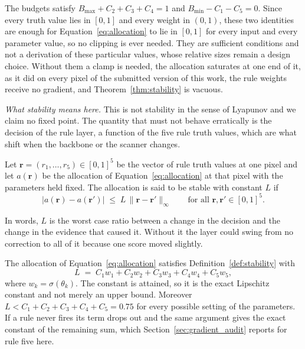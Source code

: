 The budgets satisfy $B_{\max} + C_2 + C_3 + C_4 = 1$ and $B_{\min} - C_1 - C_5 = 0$. Since every
truth value lies in $[0,1]$ and every weight in $(0,1)$, these two identities are enough for
Equation~\eqref{eq:allocation} to lie in $[0,1]$ for every input and every parameter value, so no
clipping is ever needed. They are sufficient conditions and not a derivation of these particular
values, whose relative sizes remain a design choice. Without them a clamp is needed, the allocation
saturates at one end of it, as it did on every pixel of the submitted version of this work, the rule
weights receive no gradient, and Theorem~\ref{thm:stability} is vacuous.
\label{sec:allocation_defect}

\label{sec:stability}
\emph{What stability means here.} This is not stability in the sense of Lyapunov and we claim no
fixed point. The quantity that must not behave erratically is the decision of the rule layer, a
function of the five rule truth values, which are what shift when the backbone or the scanner
changes.

\begin{definition}
\label{def:stability}
Let $\mathbf{r} = (r_1, \ldots, r_5) \in [0,1]^5$ be the vector of rule truth values at one pixel and
let $a(\mathbf{r})$ be the allocation of Equation~\eqref{eq:allocation} at that pixel with the
parameters held fixed. The allocation is said to be stable with constant $L$ if
\begin{equation}
\big| a(\mathbf{r}) - a(\mathbf{r}') \big| \;\le\; L \, \lVert \mathbf{r} - \mathbf{r}' \rVert_\infty
\qquad \text{for all } \mathbf{r}, \mathbf{r}' \in [0,1]^5 .
\label{eq:stability_def}
\end{equation}
\end{definition}

In words, $L$ is the worst case ratio between a change in the decision and the change in the evidence
that caused it. Without it the layer could swing from no correction to all of it because one score
moved slightly.


\begin{theorem}
\label{thm:stability}
The allocation of Equation~\eqref{eq:allocation} satisfies Definition~\ref{def:stability} with
\begin{equation}
L \;=\; C_1 w_1 + C_2 w_2 + C_3 w_3 + C_4 w_4 + C_5 w_5 ,
\label{eq:lipschitz}
\end{equation}
where $w_k = \sigma(\theta_k)$. The constant is attained, so it is the exact Lipschitz constant and
not merely an upper bound. Moreover $L < C_1 + C_2 + C_3 + C_4 + C_5 = 0.75$ for every possible
setting of the parameters. If a rule never fires its term drops out and the same argument gives the exact
constant of the remaining sum, which Section~\ref{sec:gradient_audit} reports for rule five here.
\end{theorem}

